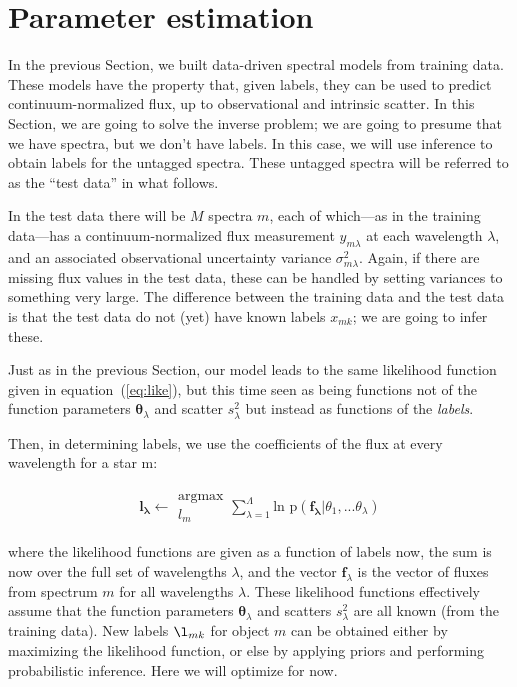 \documentclass[12pt, preprint]{aastex}
\newcommand{\sectionname}{Section}
\newcommand{\set}[1]{\bm{#1}}
\begin{document}
\section{Parameter estimation}
\label{sec:paramestimate}

In the previous \sectionname, we built data-driven spectral models
from training data.
These models have the property that, given labels, they can be used to
predict continuum-normalized flux, up to observational and intrinsic
scatter.
In this \sectionname, we are going to solve the inverse problem; we
are going to presume that we have spectra, but we don't have labels.
In this case, we will use inference to obtain labels for the untagged
spectra.
These untagged spectra will be referred to as the ``test data'' in
what follows.

In the test data there will be $M$ spectra $m$, each of which---as in
the training data---has a continuum-normalized flux measurement
$y_{m\lambda}$ at each wavelength $\lambda$, and an
associated observational uncertainty variance $\sigma_{m\lambda}^2$.
Again, if there are missing flux values in the test data, these can be
handled by setting variances to something very large.
The difference between the training data and the test data is that the
test data do not (yet) have known labels $x_{mk}$; we are going to infer
these.

Just as in the previous \sectionname, our model leads to the same likelihood function given in
equation~(\ref{eq:like}), but this time seen as
being functions not of the function parameters $\set{\theta}_\lambda$ and
scatter $s_\lambda^2$ but instead as functions of the \emph{labels}.

Then, in determining labels, we use the coefficients of the flux at every wavelength for a star m: 

\begin{eqnarray}
\set{l_\lambda} \leftarrow \substack{\mbox{argmax}\\
{l_m}  }
\sum_{\lambda=1}^\Lambda \mbox{ln p}(\set{f_\lambda} | {\theta_1,...\theta_\lambda})
\end{eqnarray}

where the likelihood functions are given as a function of labels now,
the sum is now over the full set of wavelengths
$\lambda$, and the vector $\set{f}_\lambda$ is the vector of fluxes from
spectrum $m$ for all wavelengths $\lambda$.
These likelihood functions effectively assume that the function
parameters $\set{\theta}_\lambda$ and scatters $s_\lambda^2$ are all known (from
the training data).
New labels $\l_{mk}$ for object $m$ can be obtained either by maximizing
the likelihood function, or else by applying priors
and performing probabilistic inference.
Here we will optimize for now.
\end{document}
